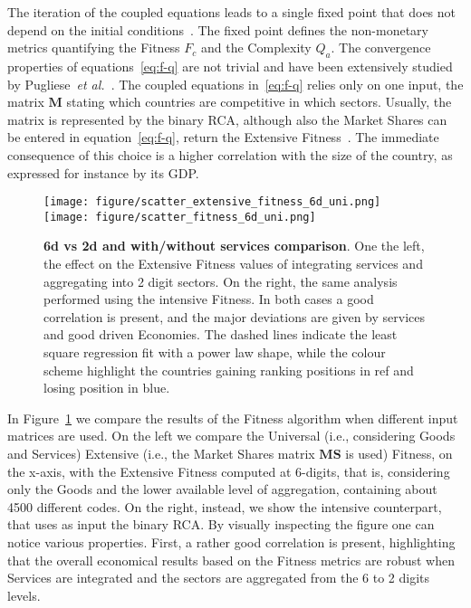 \documentclass[fleqn,10pt]{article}
\begin{document}
The iteration of the coupled equations leads to a single fixed point that does not depend on the initial conditions~\cite{Tacchella2012,Cristelli2013,Pugliese2016}.
The fixed point defines the non-monetary metrics quantifying the Fitness $F_c$ and the Complexity $Q_a$. 
The convergence properties of equations~\eqref{eq:f-q} are not trivial and have been extensively studied by Pugliese~\textit{et al.}~\cite{Pugliese2016}.
The coupled equations in~\eqref{eq:f-q} relies only on one input, the matrix $\textbf{M}$ stating which countries are competitive in which sectors. 
Usually, the matrix is represented by the binary RCA, although also the Market Shares can be entered in equation~\eqref{eq:f-q}, return the Extensive Fitness~\cite{Tacchella2012,Zaccaria2018services}.
The immediate consequence of this choice is a higher correlation with the size of the country, as expressed for instance by its GDP.
\begin{figure}[!h]
	\centering
	\texttt{[image: figure/scatter\_extensive\_fitness\_6d\_uni.png]}
	\texttt{[image: figure/scatter\_fitness\_6d\_uni.png]}
	\caption{\textbf{6d vs 2d and with/without services comparison}. One the left, the effect on the Extensive Fitness values of integrating services and aggregating into 2 digit sectors. On the right, the same analysis performed using the intensive Fitness. In both cases a good correlation is present, and the major deviations are given by services and good driven Economies. The dashed lines indicate the least square regression fit with a power law shape, while the colour scheme highlight the countries gaining ranking positions in ref and losing position in blue.}
	\label{fig:scatters}
\end{figure}
In Figure~\ref{fig:scatters} we compare the results of the Fitness algorithm when different input matrices are used. 
On the left we compare the Universal (i.e., considering Goods and Services) Extensive (i.e., the Market Shares matrix $\textbf{MS}$ is used) Fitness, on the x-axis, with the Extensive Fitness computed at 6-digits, that is, considering only the Goods and the lower available level of aggregation, containing about 4500 different codes. 
On the right, instead, we show the intensive counterpart, that uses as input the binary RCA. 
By visually inspecting the figure one can notice various properties. 
First, a rather good correlation is present, highlighting that the overall economical results based on the Fitness metrics are robust when Services are integrated and the sectors are aggregated from the 6 to 2 digits levels.
\end{document}

